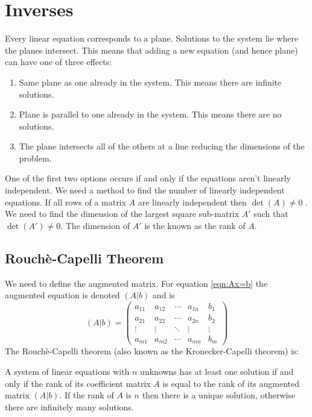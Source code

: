 \documentclass{article}
\begin{document}
    \section{Inverses}
    Every linear equation corresponds to a plane.
    Solutions to the system lie where the planes intersect.
    This means that adding a new equation (and hence plane) can have one of three effects:
    \begin{enumerate}
        \item Same plane as one already in the system. This means there are infinite solutions.
        \item Plane is parallel to one already in the system. This means there are no solutions.
        \item The plane intersects all of the others at a line reducing the dimensions of the problem.
    \end{enumerate}
    One of the first two options occurs if and only if the equations aren't linearly independent.
    We need a method to find the number of linearly independent equations.
    If all rows of a matrix \(A\) are linearly independent then \(\det(A)\ne 0\) .
    We need to find the dimension of the largest square sub-matrix \(A'\) such that \(\det(A')\ne 0\). 
    The dimension of \(A'\) is the known as the rank of \(A\).
    
    \subsection{Rouch\`e-Capelli Theorem}
    We need to define the augmented matrix. 
    For equation \ref{eqn:Ax=b} the augmented equation is denoted \((A|b)\) and is
    \[
        (A|b) = 
        \left(
        \begin{array}{cccc|c}
            a_{11} & a_{12} & \cdots & a_{1n} & b_1\\
            a_{21} & a_{22} & \cdots & a_{2n} & b_2\\
            \vdots & \vdots & \ddots & \vdots & \vdots\\
            a_{m1} & a_{m2} & \cdots & a_{mn} & b_m
        \end{array}
        \right)
    \]
    The Rouch\`e-Capelli theorem (also known as the Kronecker-Capelli theorem) is:
    \begin{displayquote}
        A system of linear equations with \(n\) unknowns has at least one solution if and only if the rank of its coefficient matrix \(A\) is equal to the rank of its augmented matrix \((A|b)\). If the rank of \(A\) is \(n\) then there is a unique solution, otherwise there are infinitely many solutions.
    \end{displayquote}
    
\end{document}
